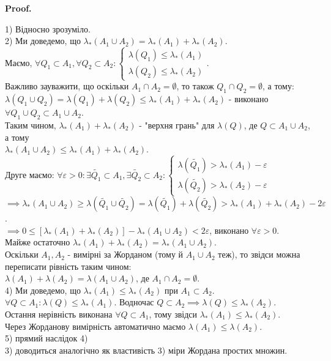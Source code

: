 \documentclass[a4paper, 10pt]{article}
\makeatletter
\def\qed{$\blacksquare$}
\theoremstyle{theoremdd}
\theoremstyle{theoremdd}
\theoremstyle{theoremdd}
\theoremstyle{theoremdd}
\theoremstyle{theoremdd}
\theoremstyle{theoremdd}
\theoremstyle{theoremdd}
\theoremstyle{theoremdd}
\renewenvironment{proof}[1][Proof.\\]{\par
\pushQED{\hfill \qed}%
\normalfont \topsep6\p@\@plus6\p@\relax
\trivlist
\item\relax
{\bfseries
#1\@addpunct{.}}\hspace\labelsep\ignorespaces
}{%
\popQED\endtrivlist\@endpefalse
}
\makeatother
\begin{document}
\begin{proof}
1) Відносно зрозуміло.
\bigskip \\
2) Ми доведемо, що $\lambda_*(A_1 \cup A_2) = \lambda_*(A_1) + \lambda_*(A_2)$.\\
Маємо, $\forall Q_1 \subset A_1, \forall Q_2 \subset A_2: \begin{cases} \lambda(Q_1) \leq \lambda_*(A_1) \\ \lambda(Q_2) \leq \lambda_*(A_2) \end{cases}$.\\
Важливо зауважити, що оскільки $A_1 \cap A_2 = \emptyset$, то також $Q_1 \cap Q_2 = \emptyset$, а тому:\\
$\lambda(Q_1 \cup Q_2) = \lambda(Q_1) + \lambda(Q_2) \leq \lambda_*(A_1) + \lambda_*(A_2)$ - виконано $\forall Q_1 \cup Q_2 \subset A_1 \cup A_2$.\\
Таким чином, $\lambda_*(A_1) + \lambda_*(A_2)$ - "верхня грань" для $\lambda(Q)$, де $Q \subset A_1 \cup A_2$, а тому \\ $\lambda_*(A_1 \cup A_2) \leq \lambda_*(A_1) + \lambda_*(A_2)$.\\
Друге маємо: $\forall \varepsilon > 0: \exists \tilde{Q_1} \subset A_1, \exists \tilde{Q_2} \subset A_2: \begin{cases} \lambda(\tilde{Q_1}) > \lambda_*(A_1) - \varepsilon \\ \lambda(\tilde{Q_2}) > \lambda_*(A_2) - \varepsilon \end{cases} $\\
$\implies \lambda_*(A_1 \cup A_2) \geq \lambda(\tilde{Q_1} \cup \tilde{Q_2}) = \lambda(\tilde{Q_1}) + \lambda(\tilde{Q_2}) > \lambda_*(A_1) + \lambda_*(A_2) - 2\varepsilon$.\\
$\implies 0 \leq [\lambda_*(A_1)+\lambda_*(A_2)] - \lambda_*(A_1 \cup A_2) < 2\varepsilon$, виконано $\forall \varepsilon > 0$.\\
Майже остаточно $\lambda_*(A_1) + \lambda_*(A_2) = \lambda_*(A_1 \cup A_2)$.\\
Оскільки $A_1,A_2$ - вимірні за Жорданом (тому й $A_1 \cup A_2$ теж), то звідси можна переписати рівність таким чином:\\
$\lambda(A_1) + \lambda(A_2) = \lambda(A_1 \cup A_2)$, де $A_1 \cap A_2 = \emptyset$.
\bigskip \\
4) Ми доведемо, що $\lambda_*(A_1) \leq \lambda_*(A_2)$ при $A_1 \subset A_2$.\\
$\forall Q \subset A_1: \lambda(Q) \leq \lambda_*(A_1)$. Водночас $Q \subset A_2 \implies \lambda(Q) \leq \lambda_*(A_2)$.\\
Остання нерівність виконана $\forall Q \subset A_1$, тому звідси $\lambda_*(A_1) \leq \lambda_*(A_2)$.\\
Через Жорданову вимірність автоматично маємо $\lambda(A_1) \leq \lambda(A_2)$.
\bigskip \\
5) прямий наслідок 4)
\bigskip \\
3) доводиться аналогічно як властивість 3) міри Жордана простих множин.
\end{proof}
\end{document}

